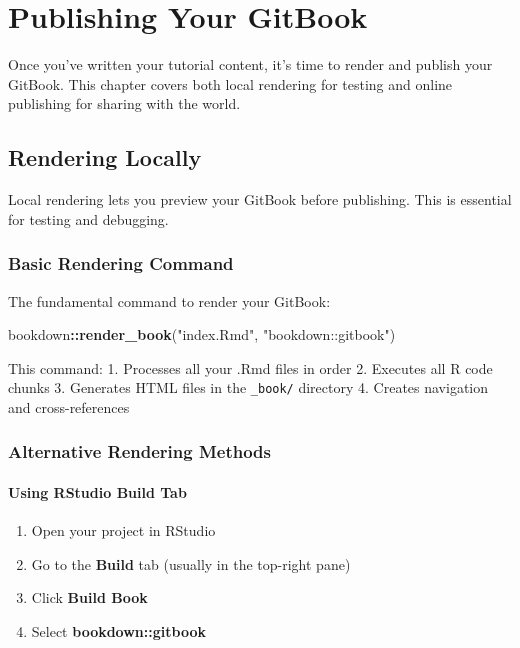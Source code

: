\documentclass[
]{book}
\newenvironment{Shaded}{\begin{snugshade}}{\end{snugshade}}
\newcommand{\FunctionTok}[1]{\textcolor[rgb]{0.13,0.29,0.53}{\textbf{#1}}}
\newcommand{\NormalTok}[1]{#1}
\newcommand{\SpecialCharTok}[1]{\textcolor[rgb]{0.81,0.36,0.00}{\textbf{#1}}}
\newcommand{\StringTok}[1]{\textcolor[rgb]{0.31,0.60,0.02}{#1}}
\providecommand{\tightlist}{%
  \setlength{\itemsep}{0pt}\setlength{\parskip}{0pt}}
\begin{document}
\chapter{Publishing Your GitBook}\label{publish}

Once you've written your tutorial content, it's time to render and publish your GitBook. This chapter covers both local rendering for testing and online publishing for sharing with the world.

\section{Rendering Locally}\label{rendering-locally}

Local rendering lets you preview your GitBook before publishing. This is essential for testing and debugging.

\subsection{Basic Rendering Command}\label{basic-rendering-command}

The fundamental command to render your GitBook:

\begin{Shaded}
\begin{Highlighting}[]
\NormalTok{bookdown}\SpecialCharTok{::}\FunctionTok{render\_book}\NormalTok{(}\StringTok{"index.Rmd"}\NormalTok{, }\StringTok{"bookdown::gitbook"}\NormalTok{)}
\end{Highlighting}
\end{Shaded}

This command:
1. Processes all your .Rmd files in order
2. Executes all R code chunks
3. Generates HTML files in the \texttt{\_book/} directory
4. Creates navigation and cross-references

\subsection{Alternative Rendering Methods}\label{alternative-rendering-methods}

\subsubsection{Using RStudio Build Tab}\label{using-rstudio-build-tab}

\begin{enumerate}
\def\labelenumi{\arabic{enumi}.}
\tightlist
\item
  Open your project in RStudio
\item
  Go to the \textbf{Build} tab (usually in the top-right pane)
\item
  Click \textbf{Build Book}
\item
  Select \textbf{bookdown::gitbook}
\end{enumerate}
\end{document}
